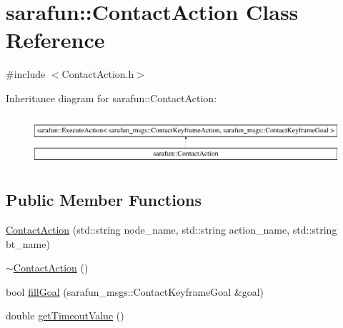 \hypertarget{classsarafun_1_1ContactAction}{\section{sarafun\-:\-:Contact\-Action Class Reference}
\label{classsarafun_1_1ContactAction}
}


{\ttfamily \#include $<$Contact\-Action.\-h$>$}

Inheritance diagram for sarafun\-:\-:Contact\-Action\-:\begin{figure}[H]
\begin{center}
\leavevmode
\includegraphics[height=1.845140cm]{classsarafun_1_1ContactAction}
\end{center}
\end{figure}
\subsection*{Public Member Functions}
\begin{DoxyCompactItemize}
\item 
\hyperlink{classsarafun_1_1ContactAction_a8374da0d20d05fe01b86f2090b2c1770}{Contact\-Action} (std\-::string node\-\_\-name, std\-::string action\-\_\-name, std\-::string bt\-\_\-name)
\item 
\hyperlink{classsarafun_1_1ContactAction_a22429fcb44fbe815f745b4924ed08f34}{$\sim$\-Contact\-Action} ()
\item 
bool \hyperlink{classsarafun_1_1ContactAction_a563907411debe223088ef5a34d8c0fb0}{fill\-Goal} (sarafun\-\_\-msgs\-::\-Contact\-Keyframe\-Goal \&goal)
\item 
double \hyperlink{classsarafun_1_1ContactAction_a85d81232d228fc6d2856d318d25c1bf9}{get\-Timeout\-Value} ()
\end{DoxyCompactItemize}


